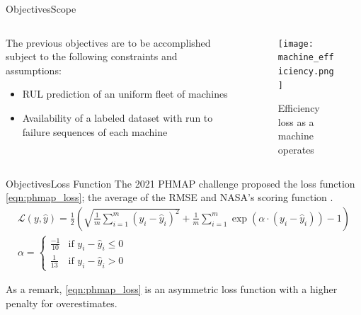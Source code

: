 \documentclass{beamer}
\begin{document}
        \begin{frame}{Objectives}{Scope}
            \begin{columns}
                \begin{column}{0.5\textwidth}
                    The previous objectives are to be accomplished subject to the following constraints and assumptions:
                    \begin{itemize}
                        \item RUL prediction of an uniform fleet of machines
                        \item Availability of a labeled dataset with run to failure sequences of each machine
                    \end{itemize}
                \end{column}
                \begin{column}{0.5\textwidth}
                    \begin{figure}[!htbp]
                        \centering
                        \texttt{[image: machine\_efficiency.png]}
                        \caption{Efficiency loss as a machine operates}
                    \end{figure}
                \end{column}
            \end{columns}
        \end{frame}

        \begin{frame}{Objectives}{Loss Function}
            The 2021 PHMAP challenge proposed the loss function \eqref{eqn:phmap_loss}; the average of the RMSE and NASA's scoring function \cite{saxena2008damage}.
            \begin{equation} \label{eqn:phmap_loss}
                \begin{gathered}
                    \mathcal{L}(y, \hat{y}) = \frac{1}{2} \left(\sqrt{\frac{1}{m}\sum_{i=1}^{m} (y_i - \hat{y}_i)^{2}} + \frac{1}{m}\sum_{i=1}^{m} \exp (\alpha \cdot (y_i - \hat{y}_i)) - 1 \right) \\
                    \alpha = \begin{cases}
                        \frac{-1}{10} & \text{if } y_i - \hat{y}_i \leq 0 \\
                        \frac{1}{13} & \text{if } y_i - \hat{y}_i > 0
                    \end{cases}
                \end{gathered}
            \end{equation}

            As a remark, \eqref{eqn:phmap_loss} is an asymmetric loss function with a higher penalty for overestimates.
        \end{frame}
\end{document}
